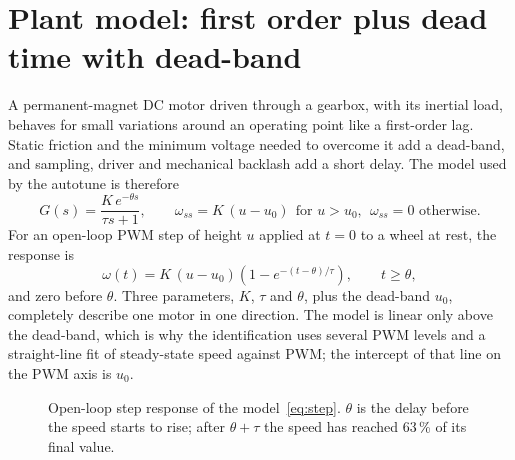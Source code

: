 \documentclass[11pt,a4paper]{report}
\begin{document}
\section{Plant model: first order plus dead time with dead-band}
A permanent-magnet DC motor driven through a gearbox, with its inertial load, behaves for small variations around an operating point like a first-order lag. Static friction and the minimum voltage needed to overcome it add a dead-band, and sampling, driver and mechanical backlash add a short delay. The model used by the autotune is therefore
\begin{equation}
  G(s) = \frac{K\,e^{-\theta s}}{\tau s + 1}, \qquad \omega_{ss} = K\,(u - u_0)\ \ \text{for } u > u_0,\ \ \omega_{ss}=0 \text{ otherwise}. \label{eq:fopdt}
\end{equation}
For an open-loop PWM step of height $u$ applied at $t=0$ to a wheel at rest, the response is
\begin{equation}
  \omega(t) = K\,(u-u_0)\left(1 - e^{-(t-\theta)/\tau}\right),\qquad t\ge\theta, \label{eq:step}
\end{equation}
and zero before $\theta$. Three parameters, $K$, $\tau$ and $\theta$, plus the dead-band $u_0$, completely describe one motor in one direction. The model is linear only above the dead-band, which is why the identification uses several PWM levels and a straight-line fit of steady-state speed against PWM; the intercept of that line on the PWM axis is $u_0$.

\begin{figure}[H]
\centering
{}
\caption{Open-loop step response of the model~\eqref{eq:step}. $\theta$ is the delay before the speed starts to rise; after $\theta+\tau$ the speed has reached 63\,\% of its final value.}\label{fig:fopdt}
\end{figure}
\end{document}
